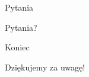 \begin{frame}{Pytania}
    \begin{center}
        {\huge Pytania?}
    \end{center}
\end{frame}

     

\begin{frame}{Koniec}
    \begin{center}
        {\huge Dziękujemy za uwagę!}
    \end{center}
\end{frame}

\pglastframe